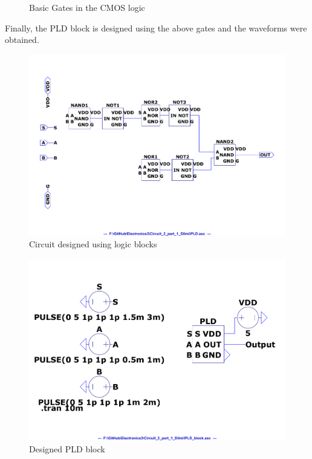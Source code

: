 \documentclass[a4paper,11pt]{article}%
\begin{document}
\begin{figure}[H]
{	}
\caption{Basic Gates in the CMOS logic}
\end{figure}
%
%
Finally, the PLD block is designed using the above gates and the waveforms were obtained.

\begin{figure}[H]
	\centering
	\includegraphics[scale=0.5]{figures/2part1/cct.pdf}
	\caption{Circuit designed using logic blocks}
\end{figure}

\begin{figure}[H]
	\centering
	\includegraphics[scale=0.5]{figures/2part1/block.pdf}
	\caption{Designed PLD block}
\end{figure}
\end{document}
